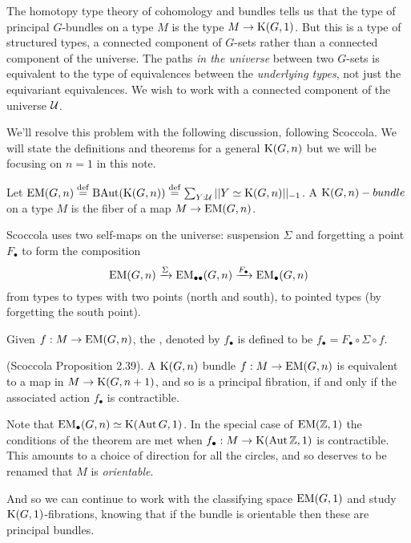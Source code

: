 The homotopy type theory of cohomology and bundles tells us that the type of principal \( G \)-bundles on a type \( M \) is the type \( M\to\mathrm{K}(G,1) \). But this is a type of structured types, a connected component of \( G \)-sets rather than a connected component of the universe. The paths \emph{in the universe} between two \( G \)-sets is equivalent to the type of equivalences between the \emph{underlying types}, not just the equivariant equivalences. We wish to work with a connected component of the universe \( \mathcal{U} \).

We'll resolve this problem with the following discussion, following Scoccola\cite{sco}. We will state the definitions and theorems for a general \( \mathrm{K}(G,n) \) but we will be focusing on \( n=1 \) in this note.

\begin{mydef}
Let \( \mathrm{EM}(G,n)\stackrel{\mathrm{def}}{=} \operatorname{BAut}(\mathrm{K}(G,n))\stackrel{\mathrm{def}}{=} \sum_{Y:\mathcal{U}}||Y\simeq \mathrm{K}(G,n)||_{-1}\). A \( \mathrm{K}(G,n)-bundle \) on a type \( M \) is the fiber of a map \( M\to\mathrm{EM}(G,n) \).
\end{mydef}

Scoccola uses two self-maps on the universe: suspension \( \Sigma \) and forgetting a point \( F_\bullet \) to form the composition 
\[ 
\mathrm{EM}(G,n)\xrightarrow[]{\Sigma} \mathrm{EM}_{\bullet\bullet}(G,n)\xrightarrow[]{F_\bullet}\mathrm{EM_{\bullet}}(G,n)
\]
from types to types with two points (north and south), to pointed types (by forgetting the south point).

\begin{mydef}
Given \( f:M\to\mathrm{EM}(G,n) \), the , denoted by \( f_\bullet \) is defined to be \( f_\bullet=F_\bullet\circ\Sigma\circ f \).
\end{mydef}

\begin{mythm}
(Scoccola\cite{sco} Proposition 2.39). A \( \mathrm{K}(G,n) \) bundle \( f:M\to\mathrm{EM}(G,n) \) is equivalent to a map in \( M\to\mathrm{K}(G,n+1) \), and so is a principal fibration, if and only if the associated action \( f_\bullet \) is contractible.
\end{mythm}

Note that \( \mathrm{EM_{\bullet}}(G,n)\simeq \mathrm{K}(\operatorname{Aut} G,1) \). In the special case of \( \mathrm{EM}(\mathbb{Z},1) \) the conditions of the theorem are met when \( f_\bullet:M\to\mathrm{K}(\operatorname{Aut} \mathbb{Z}, 1) \) is contractible. This amounts to a choice of direction for all the circles, and so deserves to be renamed that \( M \) is \emph{orientable}.

And so we can continue to work with the classifying space \( \mathrm{EM}(G,1) \) and study \( \mathrm{K}(G,1) \)-fibrations, knowing that if the bundle is orientable then these are principal bundles.

